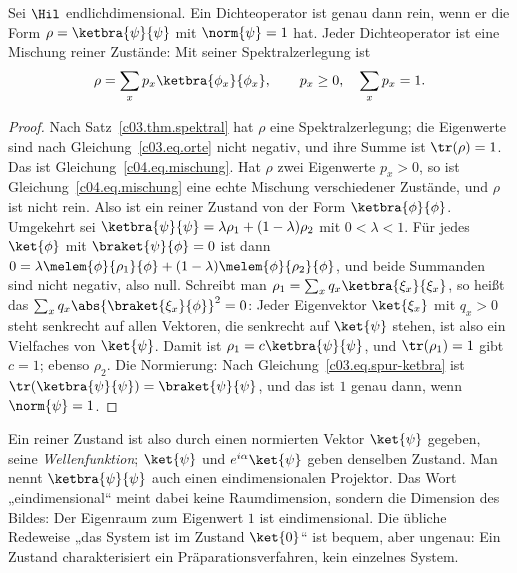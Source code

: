 \begin{proposition}\label{c04.prop.rein}
  Sei $\Hil$ endlichdimensional. Ein Dichteoperator ist genau dann rein, wenn er die Form
  $\rho = \ketbra{\psi}{\psi}$ mit $\norm{\psi} = 1$ hat. Jeder Dichteoperator ist eine Mischung
  reiner Zustände: Mit seiner Spektralzerlegung ist
  \begin{equation}\label{c04.eq.mischung}
    \rho = \sum_x p_x \ketbra{\phi_x}{\phi_x} ,
    \qquad p_x \geq 0 , \quad \sum_x p_x = 1 .
  \end{equation}
\end{proposition}
\begin{proof}
  Nach Satz~\ref{c03.thm.spektral} hat $\rho$ eine Spektralzerlegung; die Eigenwerte sind nach
  Gleichung~\eqref{c03.eq.orte} nicht negativ, und ihre Summe ist $\tr(\rho) = 1$. Das ist
  Gleichung~\eqref{c04.eq.mischung}. Hat $\rho$ zwei Eigenwerte $p_x > 0$, so ist
  Gleichung~\eqref{c04.eq.mischung} eine echte Mischung verschiedener Zustände, und $\rho$ ist nicht
  rein. Also ist ein reiner Zustand von der Form $\ketbra{\phi}{\phi}$. Umgekehrt sei
  $\ketbra{\psi}{\psi} = \lambda\rho_1 + (1-\lambda)\rho_2$ mit $0 < \lambda < 1$. Für jedes
  $\ket{\phi}$ mit $\braket{\psi}{\phi} = 0$ ist dann
  $0 = \lambda\melem{\phi}{\rho_1}{\phi} + (1-\lambda)\melem{\phi}{\rho_2}{\phi}$, und beide Summanden
  sind nicht negativ, also null. Schreibt man $\rho_1 = \sum_x q_x \ketbra{\xi_x}{\xi_x}$, so heißt
  das $\sum_x q_x \abs{\braket{\xi_x}{\phi}}^2 = 0$: Jeder Eigenvektor $\ket{\xi_x}$ mit $q_x > 0$
  steht senkrecht auf allen Vektoren, die senkrecht auf $\ket{\psi}$ stehen, ist also ein Vielfaches
  von $\ket{\psi}$. Damit ist $\rho_1 = c\ketbra{\psi}{\psi}$, und $\tr(\rho_1) = 1$ gibt $c = 1$;
  ebenso $\rho_2$. Die Normierung: Nach Gleichung~\eqref{c03.eq.spur-ketbra} ist
  $\tr(\ketbra{\psi}{\psi}) = \braket{\psi}{\psi}$, und das ist $1$ genau dann, wenn
  $\norm{\psi} = 1$.
\end{proof}

Ein reiner Zustand ist also durch einen normierten Vektor $\ket{\psi}$ gegeben, seine
\emph{Wellenfunktion}; $\ket{\psi}$ und $e^{i\alpha}\ket{\psi}$ geben denselben Zustand. Man nennt
$\ketbra{\psi}{\psi}$ auch einen eindimensionalen Projektor. Das Wort „eindimensional“ meint dabei
keine Raumdimension, sondern die Dimension des Bildes: Der Eigenraum zum Eigenwert $1$ ist eindimensional.
Die übliche Redeweise „das System ist im Zustand $\ket{0}$“ ist bequem, aber ungenau: Ein Zustand
charakterisiert ein Präparationsverfahren, kein einzelnes System.

